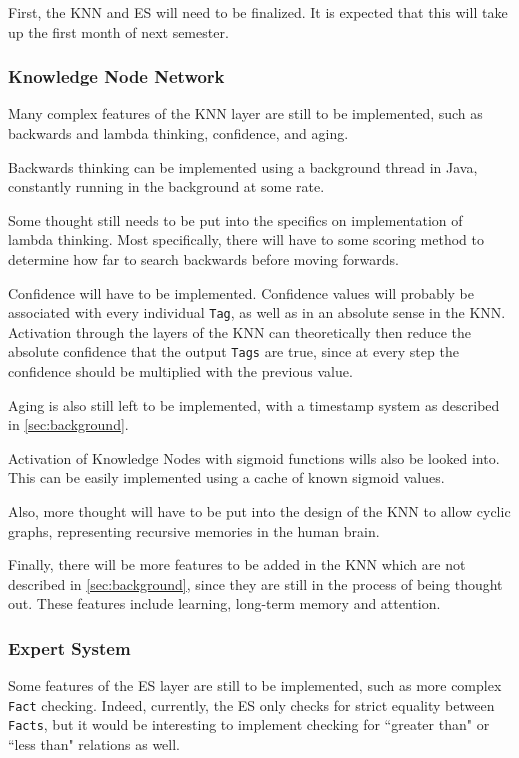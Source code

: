 \documentclass[titlepage,11pt]{article}
\newcommand{\code}[1]{\texttt{#1}}
\begin{document}
First, the KNN and ES will need to be finalized. It is expected that this will take up the first month of next semester.

\subsubsection{Knowledge Node Network}

Many complex features of the KNN layer are still to be implemented, such as backwards and lambda thinking, confidence, and aging.

Backwards thinking can be implemented using a background thread in Java, constantly running in the background at some rate.

Some thought still needs to be put into the specifics on implementation of lambda thinking. Most specifically, there will have to some scoring method to determine how far to search backwards before moving forwards.

Confidence will have to be implemented. Confidence values will probably be associated with every individual \code{Tag}, as well as in an absolute sense in the KNN. Activation through the layers of the KNN can theoretically then reduce the absolute confidence that the output \code{Tags} are true, since at every step the confidence should be multiplied with the previous value.

Aging is also still left to be implemented, with a timestamp system as described in \autoref{sec:background}.

Activation of Knowledge Nodes with sigmoid functions wills also be looked into. This can be easily implemented using a cache of known sigmoid values.

Also, more thought will have to be put into the design of the KNN to allow cyclic graphs, representing recursive memories in the human brain.

Finally, there will be more features to be added in the KNN which are not described in \autoref{sec:background}, since they are still in the process of being thought out. These features include learning, long-term memory and attention.

\subsubsection{Expert System}

Some features of the ES layer are still to be implemented, such as more complex \code{Fact} checking. Indeed, currently, the ES only checks for strict equality between \code{Facts}, but it would be interesting to implement checking for ``greater than" or ``less than" relations as well.
\end{document}
